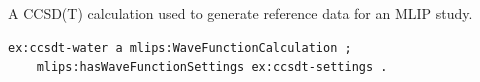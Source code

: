 A CCSD(T) calculation used to generate reference data for an MLIP study.
\begin{lstlisting}[language=turtle]
ex:ccsdt-water a mlips:WaveFunctionCalculation ;
    mlips:hasWaveFunctionSettings ex:ccsdt-settings .
\end{lstlisting}
